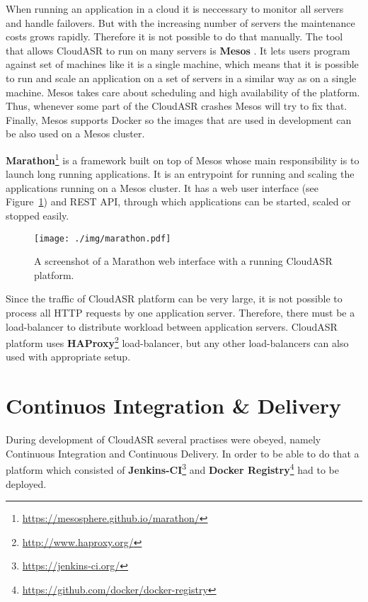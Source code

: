 When running an application in a cloud it is neccessary to monitor all servers and handle failovers.
But with the increasing number of servers the maintenance costs grows rapidly.
Therefore it is not possible to do that manually.
The tool that allows CloudASR to run on many servers is \textbf{Mesos} \cite{hindman2011mesos}.
It lets users program against set of machines like it is a single machine,
  which means that it is possible to run and scale an application on a set of servers in a similar way as on a single machine.
Mesos takes care about scheduling and high availability of the platform.
Thus, whenever some part of the CloudASR crashes Mesos will try to fix that.
Finally, Mesos supports Docker so the images that are used in development can be also used on a Mesos cluster.

\textbf{Marathon}\footnote{\url{https://mesosphere.github.io/marathon/}} is a framework built on top of Mesos whose main responsibility is to launch long running applications.
It is an entrypoint for running and scaling the applications running on a Mesos cluster.
It has a web user interface (see Figure~\ref{fig:marathon}) and REST API,
  through which applications can be started, scaled or stopped easily.

\begin{figure}
  \centering
  \texttt{[image: ./img/marathon.pdf]}

  \caption{
    A screenshot of a Marathon web interface with a running CloudASR platform.
  }
  \label{fig:marathon}
\end{figure}

Since the traffic of CloudASR platform can be very large,
  it is not possible to process all HTTP requests by one application server.
Therefore, there must be a load-balancer to distribute workload between application servers.
CloudASR platform uses \textbf{HAProxy}\footnote{\url{http://www.haproxy.org/}} load-balancer,
  but any other load-balancers can also used with appropriate setup.



\section{Continuos Integration \& Delivery}
During development of CloudASR several practises were obeyed,
  namely Continuous Integration and Continuous Delivery.
In order to be able to do that a platform which consisted of \textbf{Jenkins-CI}\footnote{\url{https://jenkins-ci.org/}} and \textbf{Docker Registry}\footnote{\url{https://github.com/docker/docker-registry}} had to be deployed.

